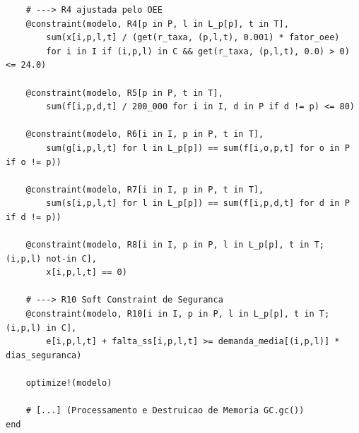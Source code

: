 \documentclass[12pt, a4paper]{article}
\begin{document}
\begin{mdframed}[style=codigo]
\begin{lstlisting}
    # ---> R4 ajustada pelo OEE
    @constraint(modelo, R4[p in P, l in L_p[p], t in T],
        sum(x[i,p,l,t] / (get(r_taxa, (p,l,t), 0.001) * fator_oee)
        for i in I if (i,p,l) in C && get(r_taxa, (p,l,t), 0.0) > 0) <= 24.0)

    @constraint(modelo, R5[p in P, t in T],
        sum(f[i,p,d,t] / 200_000 for i in I, d in P if d != p) <= 80)

    @constraint(modelo, R6[i in I, p in P, t in T],
        sum(g[i,p,l,t] for l in L_p[p]) == sum(f[i,o,p,t] for o in P if o != p))

    @constraint(modelo, R7[i in I, p in P, t in T],
        sum(s[i,p,l,t] for l in L_p[p]) == sum(f[i,p,d,t] for d in P if d != p))

    @constraint(modelo, R8[i in I, p in P, l in L_p[p], t in T; (i,p,l) not-in C], 
        x[i,p,l,t] == 0)

    # ---> R10 Soft Constraint de Seguranca
    @constraint(modelo, R10[i in I, p in P, l in L_p[p], t in T; (i,p,l) in C],
        e[i,p,l,t] + falta_ss[i,p,l,t] >= demanda_media[(i,p,l)] * dias_seguranca)

    optimize!(modelo)
    
    # [...] (Processamento e Destruicao de Memoria GC.gc())
end
\end{lstlisting}
\end{mdframed}
\end{document}
